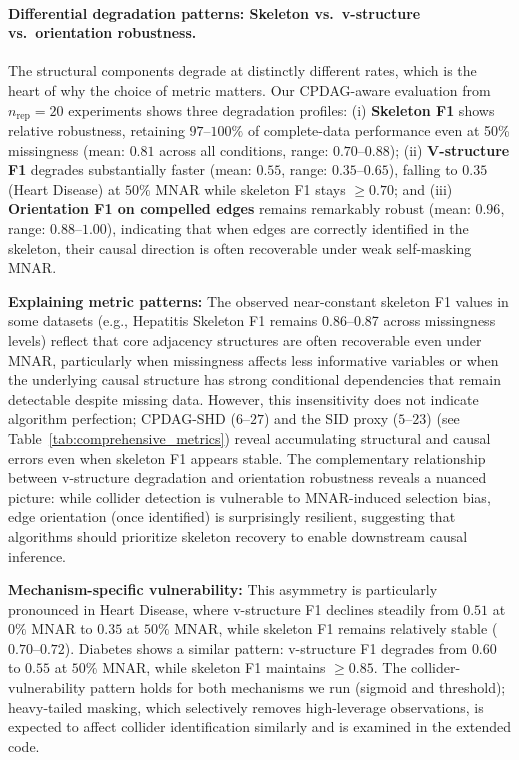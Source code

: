 \documentclass[runningheads]{llncs}
\newcommand{\Matin}{\textcolor{magenta}}
\begin{document}
\paragraph{Differential degradation patterns: Skeleton vs.\ v-structure vs.\ orientation robustness.}
The structural components degrade at distinctly different rates, which is the heart of why the choice of metric matters. Our CPDAG-aware evaluation from $n_{\text{rep}}=20$ experiments shows three degradation profiles: (i) \textbf{Skeleton F1} shows relative robustness, retaining $97$--$100\%$ of complete-data performance even at 50\% missingness (mean: $0.81$ across all conditions, range: $0.70$--$0.88$); (ii) \textbf{V-structure F1} degrades substantially faster (mean: $0.55$, range: $0.35$--$0.65$), falling to $0.35$ (Heart Disease) at $50\%$ MNAR while skeleton F1 stays $\ge0.70$; and (iii) \textbf{Orientation F1 on compelled edges} remains remarkably robust (mean: $0.96$, range: $0.88$--$1.00$), indicating that when edges are correctly identified in the skeleton, their causal direction is often recoverable under weak self-masking MNAR.

\vspace{0.1cm}
\textbf{Explaining metric patterns:} The observed near-constant skeleton F1 values in some datasets (e.g., Hepatitis Skeleton F1 remains 0.86--0.87 across missingness levels) reflect that core adjacency structures are often recoverable even under MNAR, particularly when missingness affects less informative variables or when the underlying causal structure has strong conditional dependencies that remain detectable despite missing data. However, this insensitivity does not indicate algorithm perfection; CPDAG-SHD ($6$--$27$) and the SID proxy ($5$--$23$) (see Table~\ref{tab:comprehensive_metrics}) %
reveal accumulating structural and causal errors even when skeleton F1 appears stable. The complementary relationship between v-structure degradation and orientation robustness reveals a nuanced picture: while collider detection is vulnerable to MNAR-induced selection bias, edge orientation (once identified) is surprisingly resilient, suggesting that algorithms should prioritize skeleton recovery to enable downstream causal inference.

\vspace{0.1cm}
\textbf{Mechanism-specific vulnerability:} This asymmetry is particularly pronounced in Heart Disease, where v-structure F1 declines steadily from $0.51$ at $0\%$ MNAR to $0.35$ at $50\%$ MNAR, while skeleton F1 remains relatively stable ($0.70$--$0.72$). Diabetes shows a similar pattern: v-structure F1 degrades from $0.60$ to $0.55$ at $50\%$ MNAR, while skeleton F1 maintains $\ge0.85$. The collider-vulnerability pattern holds for both mechanisms we run (sigmoid and threshold); heavy-tailed masking, which selectively removes high-leverage observations, is expected to affect collider identification similarly and is examined in the extended code.
\end{document}
